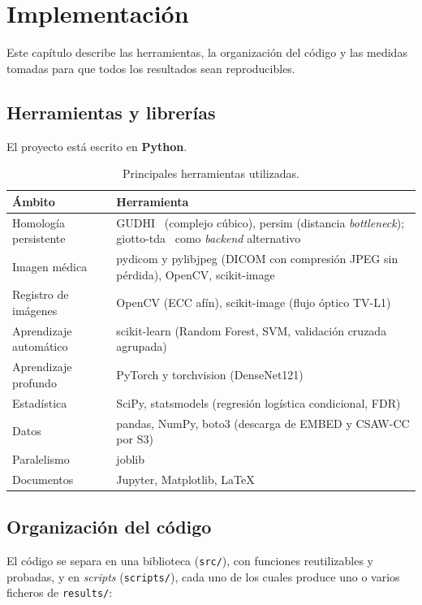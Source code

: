 \chapter{Implementación}
\label{cap:implementacion}

Este capítulo describe las herramientas, la organización del código y las
medidas tomadas para que todos los resultados sean reproducibles.

\section{Herramientas y librerías}
El proyecto está escrito en \textbf{Python}.

\begin{table}[H]
\centering
\caption{Principales herramientas utilizadas.}
\label{tab:herramientas}
\begin{tabular}{@{}lp{9.5cm}@{}}
\toprule
\textbf{Ámbito} & \textbf{Herramienta} \\
\midrule
Homología persistente   & GUDHI~\cite{maria2014gudhi} (complejo cúbico), persim (distancia \textit{bottleneck}); giotto-tda~\cite{tauzin2021giotto} como \textit{backend} alternativo \\
Imagen médica           & pydicom y pylibjpeg (DICOM con compresión JPEG sin pérdida), OpenCV, scikit-image \\
Registro de imágenes    & OpenCV (ECC afín), scikit-image (flujo óptico TV-L1) \\
Aprendizaje automático  & scikit-learn (Random Forest, SVM, validación cruzada agrupada) \\
Aprendizaje profundo    & PyTorch y torchvision (DenseNet121) \\
Estadística             & SciPy, statsmodels (regresión logística condicional, FDR) \\
Datos                   & pandas, NumPy, boto3 (descarga de EMBED y CSAW-CC por S3) \\
Paralelismo             & joblib \\
Documentos              & Jupyter, Matplotlib, \LaTeX \\
\bottomrule
\end{tabular}
\end{table}

\section{Organización del código}
El código se separa en una biblioteca (\texttt{src/}), con funciones
reutilizables y probadas, y en \textit{scripts} (\texttt{scripts/}), cada uno
de los cuales produce uno o varios ficheros de \texttt{results/}:

